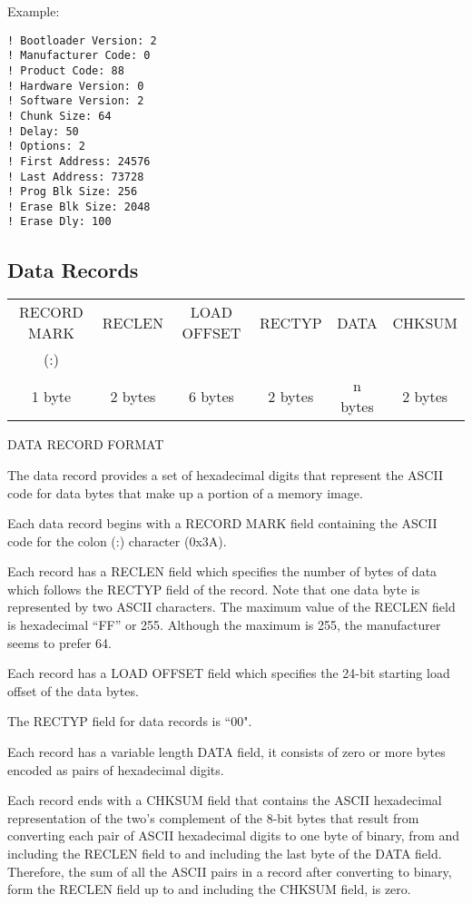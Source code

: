 Example:

\begin{verbatim}
! Bootloader Version: 2
! Manufacturer Code: 0
! Product Code: 88
! Hardware Version: 0
! Software Version: 2
! Chunk Size: 64
! Delay: 50
! Options: 2
! First Address: 24576
! Last Address: 73728
! Prog Blk Size: 256
! Erase Blk Size: 2048
! Erase Dly: 100
\end{verbatim}

\subsection{Data Records}

\begin{center}
\begin{tabular}{| c | c | c | c | c | c |}
\hline
RECORD MARK & RECLEN & LOAD OFFSET & RECTYP & DATA & CHKSUM \\
(:) &  &  &  &  &  \\
\hline
1 byte & 2 bytes & 6 bytes & 2 bytes & n bytes & 2 bytes \\
\hline
\end{tabular}

DATA RECORD FORMAT
\end{center}

The data record provides a set of hexadecimal digits that represent the ASCII code for data bytes that make up a portion of a memory image. 

Each data record begins with a RECORD MARK field containing the ASCII code for the colon (:) character (0x3A).

Each record has a RECLEN field which specifies the number of bytes of data which follows the RECTYP field of the record. Note that one data byte is represented by two ASCII characters. The maximum value of the RECLEN field is hexadecimal ``FF'' or 255. Although the maximum is 255, the manufacturer seems to prefer 64.

Each record has a LOAD OFFSET field which specifies the 24-bit starting load offset of the data bytes. 

The RECTYP field for data records is ``00".
 
Each record has a variable length DATA field, it consists of zero or more bytes encoded as pairs of hexadecimal digits. 

Each record ends with a CHKSUM field that contains the ASCII hexadecimal representation of the two's complement of the 8-bit bytes that result from converting each pair of ASCII hexadecimal digits to one byte of binary, from and including the RECLEN field to and including the last byte of the DATA field. Therefore, the sum of all the ASCII pairs in a record after converting to binary, form the RECLEN field up to and including the CHKSUM field, is zero.

